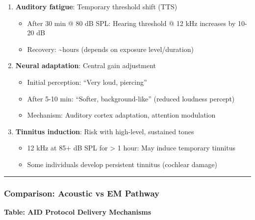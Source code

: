\begin{enumerate}
\def\labelenumi{\arabic{enumi}.}
\tightlist
\item
  \textbf{Auditory fatigue}: Temporary threshold shift (TTS)

  \begin{itemize}
  \tightlist
  \item
    After 30 min @ 80 dB SPL: Hearing threshold @ 12 kHz increases by
    10-20 dB
  \item
    Recovery: \textasciitilde hours (depends on exposure level/duration)
  \end{itemize}
\item
  \textbf{Neural adaptation}: Central gain adjustment

  \begin{itemize}
  \tightlist
  \item
    Initial perception: ``Very loud, piercing''
  \item
    After 5-10 min: ``Softer, background-like'' (reduced loudness
    percept)
  \item
    Mechanism: Auditory cortex adaptation, attention modulation
  \end{itemize}
\item
  \textbf{Tinnitus induction}: Risk with high-level, sustained tones

  \begin{itemize}
  \tightlist
  \item
    12 kHz at 85+ dB SPL for \textgreater{} 1 hour: May induce temporary
    tinnitus
  \item
    Some individuals develop persistent tinnitus (cochlear damage)
  \end{itemize}
\end{enumerate}

\begin{center}\rule{0.5\linewidth}{0.5pt}\end{center}

\subsubsection{Comparison: Acoustic vs EM
Pathway}\label{comparison-acoustic-vs-em-pathway}

\textbf{Table: AID Protocol Delivery Mechanisms}

